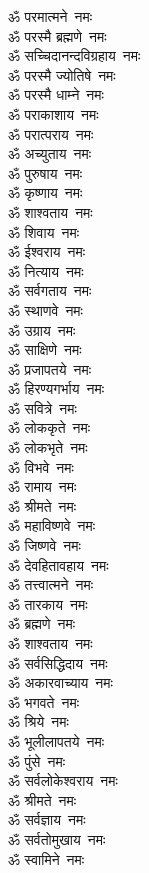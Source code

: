 \begin{multicols}{2}
\begin{flushleft}
ॐ परमात्मने~नमः\\
ॐ परस्मै ब्रह्मणे~नमः\\
ॐ सच्चिदानन्दविग्रहाय~नमः\\
ॐ परस्मै ज्योतिषे~नमः\\
ॐ परस्मै धाम्ने~नमः\\
ॐ पराकाशाय~नमः\\
ॐ परात्पराय~नमः\\
ॐ अच्युताय~नमः\\
ॐ पुरुषाय~नमः\\
ॐ कृष्णाय~नमः\hfill{}\\
ॐ शाश्वताय~नमः\\
ॐ शिवाय~नमः\\
ॐ ईश्वराय~नमः\\
ॐ नित्याय~नमः\\
ॐ सर्वगताय~नमः\\
ॐ स्थाणवे~नमः\\
ॐ उग्राय~नमः\\
ॐ साक्षिणे~नमः\\
ॐ प्रजापतये~नमः\\
ॐ हिरण्यगर्भाय~नमः\hfill{}\\
ॐ सवित्रे~नमः\\
ॐ लोककृते~नमः\\
ॐ लोकभृते~नमः\\
ॐ विभवे~नमः\\
ॐ रामाय~नमः\\
ॐ श्रीमते~नमः\\
ॐ महाविष्णवे~नमः\\
ॐ जिष्णवे~नमः\\
ॐ देवहितावहाय~नमः\\
ॐ तत्त्वात्मने~नमः\hfill{}\\
ॐ तारकाय~नमः\\
ॐ ब्रह्मणे~नमः\\
ॐ शाश्वताय~नमः\\
ॐ सर्वसिद्धिदाय~नमः\\
ॐ अकारवाच्याय~नमः\\
ॐ भगवते~नमः\\
ॐ श्रिये~नमः\\
ॐ भूलीलापतये~नमः\\
ॐ पुंसे~नमः\\
ॐ सर्वलोकेश्वराय~नमः\hfill{}\\
ॐ श्रीमते~नमः\\
ॐ सर्वज्ञाय~नमः\\
ॐ सर्वतोमुखाय~नमः\\
ॐ स्वामिने~नमः\\

\end{flushleft}
\end{multicols}
